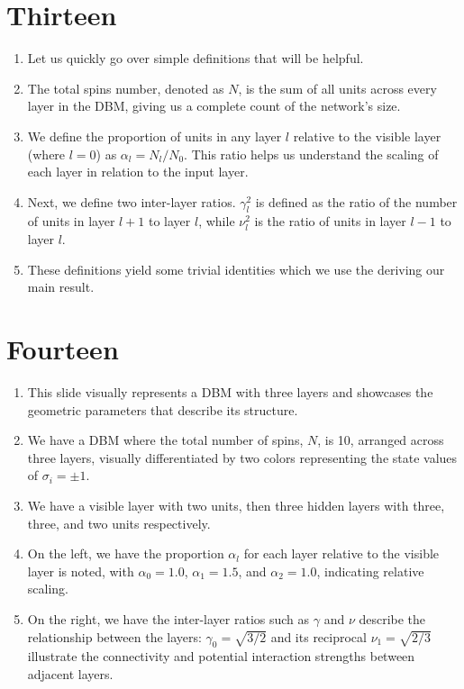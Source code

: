 \documentclass{article}
\begin{document}
\section*{Thirteen}
\begin{enumerate}
    \item Let us quickly go over simple definitions that will be helpful.
    \item The total spins number, denoted as \( N \), is the sum of all units across every layer in the DBM, giving us a complete count of the network's size.
    \item We define the proportion of units in any layer \( l \) relative to the visible layer (where \( l = 0 \)) as \( \alpha_l = N_l / N_0 \). This ratio helps us understand the scaling of each layer in relation to the input layer.
    \item Next, we define two inter-layer ratios. \( \gamma_l^2 \) is defined as the ratio of the number of units in layer \( l+1 \) to layer \( l \), while \( \nu_l^2 \) is the ratio of units in layer \( l-1 \) to layer \( l \).
    \item These definitions yield some trivial identities which we use the deriving our main result.
\end{enumerate}

\section*{Fourteen}
\begin{enumerate}
    \item This slide visually represents a DBM with three layers and showcases the geometric parameters that describe its structure.
    \item We have a DBM where the total number of spins, \( N \), is 10, arranged across three layers, visually differentiated by two colors representing the state values of \(\sigma_i = \pm 1\).
    \item We have a visible layer with two units, then three hidden layers with three, three, and two units respectively.
    \item On the left, we have the proportion \( \alpha_l \) for each layer relative to the visible layer is noted, with \(\alpha_0 = 1.0\), \(\alpha_1 = 1.5\), and \(\alpha_2 = 1.0\), indicating relative scaling.
    \item On the right, we have the inter-layer ratios such as \( \gamma \) and \( \nu \) describe the relationship between the layers: \( \gamma_0 = \sqrt{3/2} \) and its reciprocal \( \nu_1 = \sqrt{2/3} \) illustrate the connectivity and potential interaction strengths between adjacent layers.
\end{enumerate}
\end{document}
